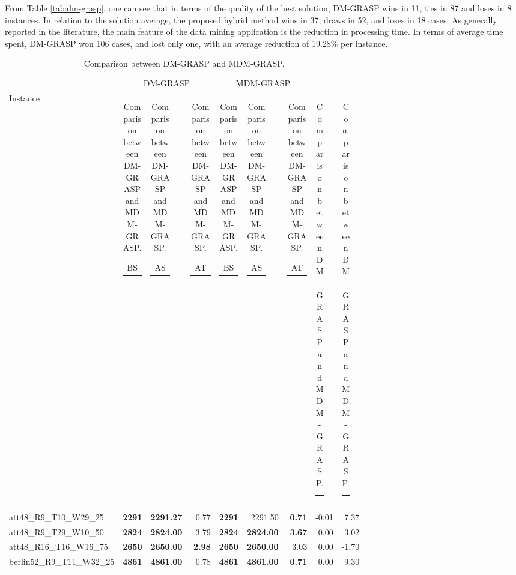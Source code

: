 \documentclass{singlecol-new}
\begin{document}
From Table \ref{tab:dm-grasp}, one can see that in terms of the quality of the best solution, DM-GRASP wins in 11, ties in 87 and loses in 8 instances. In relation to the solution average, the proposed hybrid method wins in 37, draws in 52, and loses in 18 cases. As generally reported in the literature, the main feature of the data mining application is the reduction in processing time. In terms of average time spent, DM-GRASP won 106 cases, and lost only one, with an average reduction of 19.28\% per instance.

\begin{scriptsize}
	\begin{longtable}{lrrrrrrrr}
		\caption{Comparison between DM-GRASP and MDM-GRASP.}
		\label{tab:mdm-grasp}\\
		\hline
		& \multicolumn{3}{c}{DM-GRASP} & \multicolumn{3}{c}{MDM-GRASP} \\
		\cline{2-9}
		Instance & \begin{tabular}[c]{@{}l@{}}BS\end{tabular} & \begin{tabular}[c]{@{}l@{}}AS\end{tabular} & \begin{tabular}[r]{@{}l@{}}AT\end{tabular} & \begin{tabular}[r]{@{}l@{}}BS\end{tabular} & \begin{tabular}[c]{@{}l@{}}AS\end{tabular} & \begin{tabular}[r]{@{}l@{}}AT\end{tabular} & \begin{tabular}[c]{@{}l@{}}$Dif_{ms}$\end{tabular} & \begin{tabular}[c]{@{}l@{}}$Dif_{T}$\end{tabular} \\
		\hline
		\endhead
		att48\_R9\_T10\_W29\_25 & \textbf{2291} & \textbf{2291.27} & 0.77 & \textbf{2291} & 2291.50 & \textbf{0.71} & -0.01 & 7.37 \\
		att48\_R9\_T29\_W10\_50 & \textbf{2824} & \textbf{2824.00} & 3.79 & \textbf{2824} & \textbf{2824.00} & \textbf{3.67} & 0.00 & 3.02 \\
		att48\_R16\_T16\_W16\_75 & \textbf{2650} & \textbf{2650.00} & \textbf{2.98} & \textbf{2650} & \textbf{2650.00} & 3.03 & 0.00 & -1.70 \\
		berlin52\_R9\_T11\_W32\_25 & \textbf{4861} & \textbf{4861.00} & 0.78 & \textbf{4861} & \textbf{4861.00} & \textbf{0.71} & 0.00 & 9.30 \\

\end{longtable}
\end{scriptsize}
\end{document}
